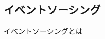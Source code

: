 \documentclass[../../../main]{subfiles}
\begin{document}
    \subsection{イベントソーシング}\label{subsec:phraseology-event_sourcing}

    イベントソーシングとは
\end{document}
